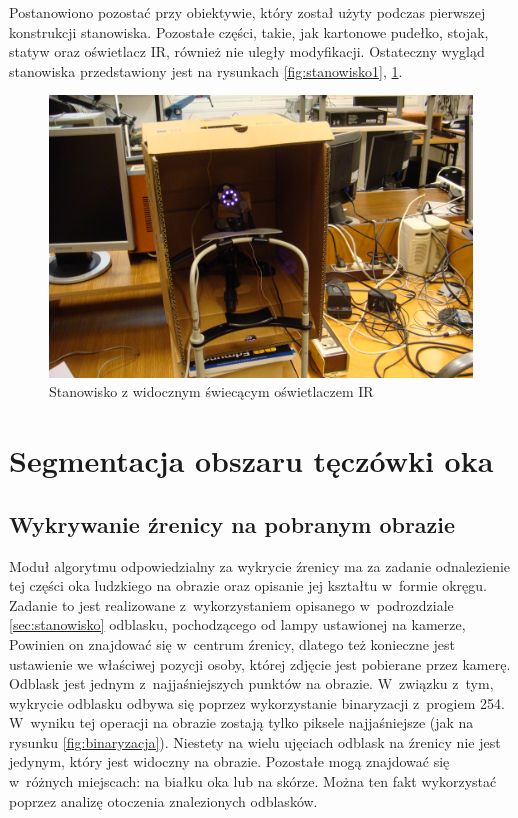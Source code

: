 Postanowiono pozostać przy obiektywie, który został użyty podczas pierwszej konstrukcji stanowiska. Pozostałe części, takie, jak kartonowe pudełko, stojak, statyw oraz oświetlacz IR, również nie uległy modyfikacji. Ostateczny wygląd stanowiska przedstawiony jest na rysunkach \ref{fig:stanowisko1}, \ref{fig:stanowisko2}.

\begin{figure}[h!]
\begin{center}
\includegraphics[scale=0.1]{stanowisko2.jpg}
\caption{Stanowisko z widocznym świecącym oświetlaczem IR}
\label{fig:stanowisko2}
\end{center}
\end{figure}

\section{Segmentacja obszaru tęczówki oka}
\subsection{Wykrywanie źrenicy na pobranym obrazie}
\label{sec:wykrycieZrenicy}

Moduł algorytmu odpowiedzialny za wykrycie źrenicy ma za zadanie odnalezienie tej części oka ludzkiego na obrazie oraz opisanie jej kształtu w~formie okręgu. Zadanie to jest realizowane z~wykorzystaniem opisanego w~podrozdziale \ref{sec:stanowisko} odblasku, pochodzącego od lampy ustawionej na kamerze, Powinien on znajdować się w~centrum źrenicy, dlatego też konieczne jest ustawienie we właściwej pozycji osoby, której zdjęcie jest pobierane przez kamerę. Odblask jest jednym z~najjaśniejszych punktów na obrazie. W~związku z~tym, wykrycie odblasku odbywa się poprzez wykorzystanie binaryzacji z~progiem 254. W~wyniku tej operacji na obrazie zostają tylko piksele najjaśniejsze (jak na rysunku \ref{fig:binaryzacja}). Niestety na wielu ujęciach odblask na źrenicy nie jest jedynym, który jest widoczny na obrazie. Pozostałe mogą znajdować się w~różnych miejscach: na białku oka lub na skórze. Można ten fakt wykorzystać poprzez analizę otoczenia znalezionych odblasków. 

